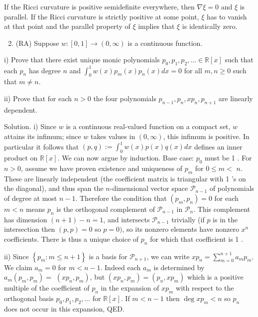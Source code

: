 \documentclass[10pt]{article}
\begin{document}
If the Ricci curvature is positive semidefinite everywhere, then $\nabla \xi=0$ and $\xi$ is parallel. If the Ricci curvature is strictly positive at some point, $\xi$ has to vanish at that point and the parallel property of $\xi$ implies that $\xi$ is identically zero.

\begin{enumerate}
  \setcounter{enumi}{1}
  \item (RA) Suppose $w:[0,1] \rightarrow(0, \infty)$ is a continuous function.
\end{enumerate}

i) Prove that there exist unique monic polynomials $p_{0}, p_{1}, p_{2}, \ldots \in \mathbb{R}[x]$ such that each $p_{n}$ has degree $n$ and $\int_{0}^{1} w(x) p_{m}(x) p_{n}(x) d x=0$ for all $m, n \geq 0$ such that $m \neq n$.

ii) Prove that for each $n>0$ the four polynomials $p_{n-1}, p_{n}, x p_{n}, p_{n+1}$ are linearly dependent.

Solution. i) Since $w$ is a continuous real-valued function on a compact set, $w$ attains its infimum; since $w$ takes values in $(0, \infty)$, this infimum is positive. In particular it follows that $(p, q):=\int_{0}^{1} w(x) p(x) q(x) d x$ defines an inner product on $\mathbb{R}[x]$. We can now argue by induction. Base case: $p_{0}$ must be 1 . For $n>0$, assume we have proven existence and uniqueness of $p_{m}$ for $0 \leq m<$ $n$. These are linearly independent (the coefficient matrix is triangular with 1 's on the diagonal), and thus span the $n$-dimensional vector space $\mathcal{P}_{n-1}$ of
polynomials of degree at most $n-1$. Therefore the condition that $\left(p_{m}, p_{n}\right)=0$ for each $m<n$ means $p_{n}$ is the orthogonal complement of $\mathcal{P}_{n-1}$ in $\mathcal{P}_{n}$. This complement has dimension $(n+1)-n=1$, and intersects $\mathcal{P}_{n-1}$ trivially (if $p$ is in the intersection then $(p, p)=0$ so $p=0)$, so its nonzero elements have nonzero $x^{n}$ coefficients. There is thus a unique choice of $p_{n}$ for which that coefficient is 1 .

ii) Since $\left\{p_{m}: m \leq n+1\right\}$ is a basis for $\mathcal{P}_{n+1}$, we can write $x p_{n}=\sum_{m=0}^{n+1} a_{m} p_{m}$. We claim $a_{m}=0$ for $m<n-1$. Indeed each $a_{m}$ is determined by $a_{m}\left(p_{m}, p_{m}\right)=$ $\left(x p_{n}, p_{m}\right)$, but $\left(x p_{n}, p_{m}\right)=\left(p_{n}, x p_{m}\right)$ which is a positive multiple of the coefficient of $p_{n}$ in the expansion of $x p_{m}$ with respect to the orthogonal basis $p_{0}, p_{1}, p_{2}, \ldots$ for $\mathbb{R}[x]$. If $m<n-1$ then $\operatorname{deg} x p_{m}<n$ so $p_{n}$ does not occur in this expansion, QED.
\end{document}
